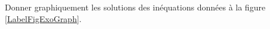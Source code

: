 
\begin{exercice}\label{exoSeconde-0071}


    Donner graphiquement les solutions des inéquations données à la figure \ref{LabelFigExoGraph}.
    \newcommand{\CaptionFigExoGraph}{Des inéquations à résoudre pour l'exercice \ref{exoSeconde-0071}.}


\end{exercice}
